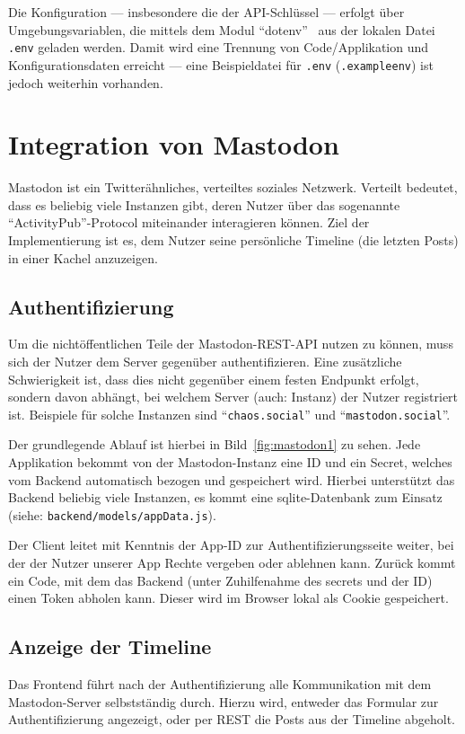 \documentclass[fleqn,10pt]{SelfArx} %
\begin{document}
Die Konfiguration --- insbesondere die der API-Schlüssel --- erfolgt über Umgebungsvariablen, die mittels dem Modul \enquote{dotenv}~\cite{dotenv} aus der lokalen Datei \texttt{.env} geladen werden. Damit wird eine Trennung von Code/Applikation und Konfigurationsdaten erreicht --- eine Beispieldatei für \texttt{.env} (\texttt{.exampleenv}) ist jedoch weiterhin vorhanden.
\section{Integration von Mastodon}
Mastodon ist ein Twitterähnliches, verteiltes soziales Netzwerk. Verteilt bedeutet, dass es beliebig viele Instanzen gibt, deren Nutzer über das sogenannte \enquote{ActivityPub}-Protocol miteinander interagieren können. Ziel der Implementierung ist es, dem Nutzer seine persönliche Timeline (die letzten Posts) in einer Kachel anzuzeigen.
\subsection{Authentifizierung}
Um die nichtöffentlichen Teile der Mastodon-REST-API nutzen zu können, muss sich der Nutzer dem Server gegenüber authentifizieren. Eine zusätzliche Schwierigkeit ist, dass dies nicht gegenüber einem festen Endpunkt erfolgt, sondern davon abhängt, bei welchem Server (auch: Instanz) der Nutzer registriert ist. Beispiele für solche Instanzen sind \enquote{\texttt{chaos.social}} und \enquote{\texttt{mastodon.social}}.

Der grundlegende Ablauf ist hierbei in Bild~\ref{fig:mastodon1} zu sehen. Jede Applikation bekommt von der Mastodon-Instanz eine ID und ein Secret, welches vom Backend automatisch bezogen und gespeichert wird. Hierbei unterstützt das Backend beliebig viele Instanzen, es kommt eine sqlite-Datenbank zum Einsatz (siehe: \texttt{backend/models/appData.js}).

Der Client leitet mit Kenntnis der App-ID zur Authentifizierungsseite weiter, bei der der Nutzer unserer App Rechte vergeben oder ablehnen kann. Zurück kommt ein Code, mit dem das Backend (unter Zuhilfenahme des secrets und der ID) einen Token abholen kann. Dieser wird im Browser lokal als Cookie gespeichert.
\subsection{Anzeige der Timeline}
Das Frontend führt nach der Authentifizierung alle Kommunikation mit dem Mastodon-Server selbstständig durch. Hierzu wird, entweder das Formular zur Authentifizierung angezeigt, oder per REST die Posts aus der Timeline abgeholt.
\end{document}

